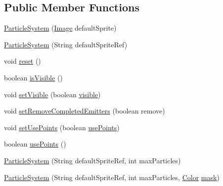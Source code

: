 \subsection*{Public Member Functions}
\begin{DoxyCompactItemize}
\item 
\mbox{\hyperlink{classorg_1_1newdawn_1_1slick_1_1particles_1_1_particle_system_a03c5c4ad49a3db42ebb36e87d2a18583}{Particle\+System}} (\mbox{\hyperlink{classorg_1_1newdawn_1_1slick_1_1_image}{Image}} default\+Sprite)
\item 
\mbox{\hyperlink{classorg_1_1newdawn_1_1slick_1_1particles_1_1_particle_system_a11617a1affa327ab75563754741dddf5}{Particle\+System}} (String default\+Sprite\+Ref)
\item 
void \mbox{\hyperlink{classorg_1_1newdawn_1_1slick_1_1particles_1_1_particle_system_af16b870d3bec4c9d898245cf209a0e5c}{reset}} ()
\item 
boolean \mbox{\hyperlink{classorg_1_1newdawn_1_1slick_1_1particles_1_1_particle_system_a845632f22e34f3394b4add0862478f1e}{is\+Visible}} ()
\item 
void \mbox{\hyperlink{classorg_1_1newdawn_1_1slick_1_1particles_1_1_particle_system_a37d6c2e79bd8b822c8cb8eb34a279576}{set\+Visible}} (boolean \mbox{\hyperlink{classorg_1_1newdawn_1_1slick_1_1particles_1_1_particle_system_ad2769d90adecc35330066468f02ac881}{visible}})
\item 
void \mbox{\hyperlink{classorg_1_1newdawn_1_1slick_1_1particles_1_1_particle_system_af471c877884c73411ed37a28755b62b0}{set\+Remove\+Completed\+Emitters}} (boolean remove)
\item 
void \mbox{\hyperlink{classorg_1_1newdawn_1_1slick_1_1particles_1_1_particle_system_aa4c13ea337e97c887ba377724615e374}{set\+Use\+Points}} (boolean \mbox{\hyperlink{classorg_1_1newdawn_1_1slick_1_1particles_1_1_particle_system_ac3757b740ac52bac42a01c4f6944c660}{use\+Points}})
\item 
boolean \mbox{\hyperlink{classorg_1_1newdawn_1_1slick_1_1particles_1_1_particle_system_ad0949468683934abaf4fb0f3ae38004b}{use\+Points}} ()
\item 
\mbox{\hyperlink{classorg_1_1newdawn_1_1slick_1_1particles_1_1_particle_system_a5b93e9be66c34e8edabfd5048c005671}{Particle\+System}} (String default\+Sprite\+Ref, int max\+Particles)
\item 
\mbox{\hyperlink{classorg_1_1newdawn_1_1slick_1_1particles_1_1_particle_system_afc839092dcd936aaa301a6de796eb014}{Particle\+System}} (String default\+Sprite\+Ref, int max\+Particles, \mbox{\hyperlink{classorg_1_1newdawn_1_1slick_1_1_color}{Color}} \mbox{\hyperlink{classorg_1_1newdawn_1_1slick_1_1particles_1_1_particle_system_a75111c35416632fb81c11c808d0158d0}{mask}})

\end{DoxyCompactItemize}
